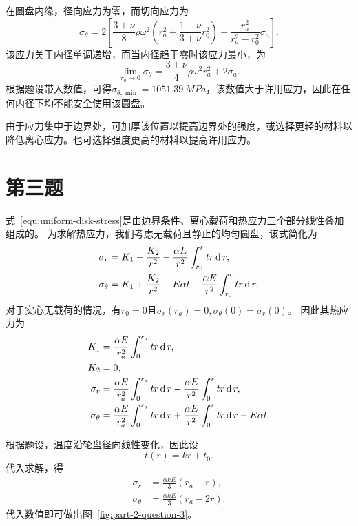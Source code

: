 在圆盘内缘，径向应力为零，而切向应力为
\begin{equation}
    \sigma_\theta = 2 \left[ \frac{3 + \nu}{8} \rho \omega^2 \left( r_a^2 + \frac{1 - \nu}{3 + \nu} r_0^2\right) + \frac{r_a^2}{r_a^2 - r_0^2} \sigma_a \right].
\end{equation}
该应力关于内径单调递增，而当内径趋于零时该应力最小，为
\begin{equation}
    \lim_{r_0 \to 0} \sigma_\theta = \frac{3 + \nu}{4} \rho \omega^2 r_a^2 + 2 \sigma_a.
\end{equation}
根据题设带入数值，可得\(\sigma_{\theta, \min} = \qty{1051.39}{MPa}\)，该数值大于许用应力，因此在任何内径下均不能安全使用该圆盘。

由于应力集中于边界处，可加厚该位置以提高边界处的强度，或选择更轻的材料以降低离心应力。也可选择强度更高的材料以提高许用应力。

\section{第三题}

式~\ref{equ:uniform-disk-stress}是由边界条件、离心载荷和热应力三个部分线性叠加组成的。
为求解热应力，我们考虑无载荷且静止的均匀圆盘，该式简化为
\begin{equation}
    \begin{aligned}
        \sigma_r &= K_1 - \frac{K_2}{r^2} - \frac{\alpha E}{r^2} \int_{r_0}^r tr \operatorname{\mathop{} \! \mathrm{d}} r, \\
        \sigma_\theta & = K_1 + \frac{K_2}{r^2} - E \alpha t + \frac{\alpha E}{r^2} \int_{r_0}^r tr \operatorname{\mathop{} \! \mathrm{d}} r.
    \end{aligned}
\end{equation}
对于实心无载荷的情况，有$r_0 = 0$且$\sigma_r(r_a) = 0, \sigma_\theta(0) = \sigma_r(0)$。
因此其热应力为
\begin{equation}
    \begin{aligned}
        K_1 &= \frac{\alpha E}{r_a^2} \int^{r_a}_0 tr \operatorname{\mathop{} \! \mathrm{d}} r, \\
        K_2 &= 0, \\
        \sigma_{r} &= \frac{\alpha E}{r_a^2} \int^{r_a}_0 tr \operatorname{\mathop{} \! \mathrm{d}} r - \frac{\alpha E}{r^2} \int_0^r tr \operatorname{\mathop{} \! \mathrm{d}} r, \\
        \sigma_\theta &= \frac{\alpha E}{r_a^2} \int^{r_a}_0 tr \operatorname{\mathop{} \! \mathrm{d}} r + \frac{\alpha E}{r^2} \int_0^r tr \operatorname{\mathop{} \! \mathrm{d}} r - E \alpha t.
    \end{aligned}
\end{equation}

根据题设，温度沿轮盘径向线性变化，因此设
\begin{equation}
    t(r) = kr + t_0.
\end{equation}
代入求解，得
\begin{equation}
    \begin{aligned}
        \sigma_{r} &= \frac{\alpha k E}{3} (r_a - r),\\
        \sigma_\theta &= \frac{\alpha k E}{3} (r_a - 2 r).
    \end{aligned}
\end{equation}
代入数值即可做出图~\ref{fig:part-2-question-3}。

